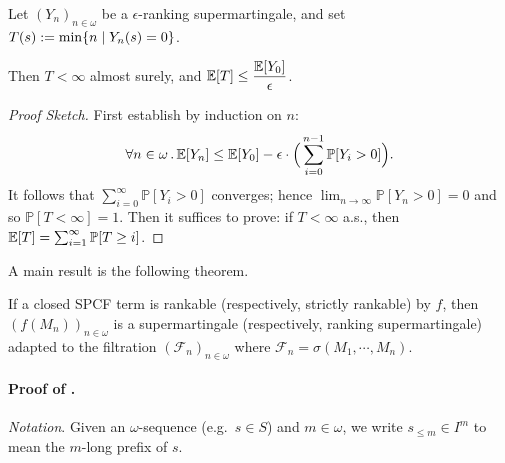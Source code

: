 \begin{theorem}
\label{thm:rank-PAST}
Let $(Y_n)_{n \in \omega}$ be a $\epsilon$-ranking supermartingale, and set $T(s) := \min \{n \mid Y_n(s) = 0\}$. 

Then $T < \infty$ almost surely, and $\mathbb{E}[T] \leq \dfrac{\mathbb{E}[Y_0]}{\epsilon}$.
\end{theorem}

\begin{proof}[Proof Sketch]
First establish by induction on $n$: 
\[
\forall n \in \omega \, . \, \mathbb{E}[Y_n] \leq \mathbb{E}[Y_0] - \epsilon \cdot \Big(\sum_{i=0}^{n-1} \mathbb{P}[Y_i > 0]\Big).
\]
It follows that $\sum_{i=0}^{\infty} \mathbb{P}[Y_i > 0]$ converges; hence $\lim_{n \to \infty} \mathbb{P}[Y_n > 0] = 0$ and so $\mathbb{P}[T < \infty] = 1$.
Then it suffices to prove: if $T < \infty$ a.s., then $\mathbb{E}[T] = \sum^\infty_{i=1} \mathbb{P}[T \geq i]$.
\end{proof}

\medskip

A main result is the following theorem.
\begin{theorem} 
\label{thm:rankable and strict rankable}
If a closed SPCF term is rankable (respectively, strictly rankable) by $f$, then $(f(M_n))_{n \in \omega}$ is a 
supermartingale (respectively, ranking supermartingale) adapted to the filtration $(\mathcal{F}_n)_{n \in \omega}$ where $\mathcal{F}_n = \sigma(M_1, \cdots, M_n)$.
\end{theorem}


\paragraph{Proof of .}
\emph{Notation}. Given an $\omega$-sequence (e.g.~$s \in S$) and $m \in \omega$, we write $s_{\leq m} \in I^m$ to mean the $m$-long prefix of $s$.


